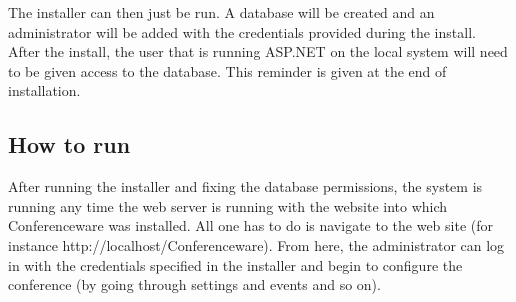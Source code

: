 \documentclass[12pt]{article}
\begin{document}
The installer can then just be run. A database will be created and an
administrator will be added with the credentials provided during the install.
After the install, the user that is running ASP.NET on the local system will
need to be given access to the database. This reminder is given at the end of
installation.
\subsection{How to run}
After running the installer and fixing the database permissions, the system is
running any time the web server is running with the website into which
Conferenceware was installed. All one has to do is navigate to the web site (for
instance http://localhost/Conferenceware). From here, the administrator can log
in with the credentials specified in the installer and begin to configure the
conference (by going through settings and events and so on).
\end{document}
